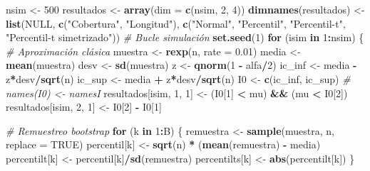 \documentclass[]{book}
\newenvironment{Shaded}{\begin{snugshade}}{\end{snugshade}}
\newcommand{\KeywordTok}[1]{\textcolor[rgb]{0.13,0.29,0.53}{\textbf{#1}}}
\newcommand{\DataTypeTok}[1]{\textcolor[rgb]{0.13,0.29,0.53}{#1}}
\newcommand{\DecValTok}[1]{\textcolor[rgb]{0.00,0.00,0.81}{#1}}
\newcommand{\FloatTok}[1]{\textcolor[rgb]{0.00,0.00,0.81}{#1}}
\newcommand{\StringTok}[1]{\textcolor[rgb]{0.31,0.60,0.02}{#1}}
\newcommand{\CommentTok}[1]{\textcolor[rgb]{0.56,0.35,0.01}{\textit{#1}}}
\newcommand{\OtherTok}[1]{\textcolor[rgb]{0.56,0.35,0.01}{#1}}
\newcommand{\ControlFlowTok}[1]{\textcolor[rgb]{0.13,0.29,0.53}{\textbf{#1}}}
\newcommand{\OperatorTok}[1]{\textcolor[rgb]{0.81,0.36,0.00}{\textbf{#1}}}
\newcommand{\NormalTok}[1]{#1}
\theoremstyle{definition}
\theoremstyle{definition}
\theoremstyle{definition}
\theoremstyle{remark}
\begin{document}
\begin{Shaded}
\begin{Highlighting}[]
{\NormalTok{nsim <-}\StringTok{ }\DecValTok{500}
\NormalTok{resultados <-}\StringTok{ }\KeywordTok{array}\NormalTok{(}\DataTypeTok{dim =} \KeywordTok{c}\NormalTok{(nsim, }\DecValTok{2}\NormalTok{, }\DecValTok{4}\NormalTok{))}
\KeywordTok{dimnames}\NormalTok{(resultados) <-}\StringTok{ }\KeywordTok{list}\NormalTok{(}\OtherTok{NULL}\NormalTok{, }\KeywordTok{c}\NormalTok{(}\StringTok{"Cobertura"}\NormalTok{, }\StringTok{"Longitud"}\NormalTok{),}
        \KeywordTok{c}\NormalTok{(}\StringTok{"Normal"}\NormalTok{, }\StringTok{"Percentil"}\NormalTok{, }\StringTok{"Percentil-t"}\NormalTok{, }\StringTok{"Percentil-t simetrizado"}\NormalTok{))}
\CommentTok{# Bucle simulación}
\KeywordTok{set.seed}\NormalTok{(}\DecValTok{1}\NormalTok{)}
\ControlFlowTok{for}\NormalTok{ (isim }\ControlFlowTok{in} \DecValTok{1}\OperatorTok{:}\NormalTok{nsim) \{}
    \CommentTok{# Aproximación clásica}
\NormalTok{    muestra <-}\StringTok{ }\KeywordTok{rexp}\NormalTok{(n, }\DataTypeTok{rate =} \FloatTok{0.01}\NormalTok{)}
\NormalTok{    media <-}\StringTok{ }\KeywordTok{mean}\NormalTok{(muestra)}
\NormalTok{    desv <-}\StringTok{ }\KeywordTok{sd}\NormalTok{(muestra)}
\NormalTok{    z <-}\StringTok{ }\KeywordTok{qnorm}\NormalTok{(}\DecValTok{1} \OperatorTok{-}\StringTok{ }\NormalTok{alfa}\OperatorTok{/}\DecValTok{2}\NormalTok{)}
\NormalTok{    ic_inf <-}\StringTok{ }\NormalTok{media }\OperatorTok{-}\StringTok{ }\NormalTok{z}\OperatorTok{*}\NormalTok{desv}\OperatorTok{/}\KeywordTok{sqrt}\NormalTok{(n)}
\NormalTok{    ic_sup <-}\StringTok{ }\NormalTok{media }\OperatorTok{+}\StringTok{ }\NormalTok{z}\OperatorTok{*}\NormalTok{desv}\OperatorTok{/}\KeywordTok{sqrt}\NormalTok{(n)}
\NormalTok{    I0 <-}\StringTok{ }\KeywordTok{c}\NormalTok{(ic_inf, ic_sup)}
    \CommentTok{# names(I0) <- namesI}
\NormalTok{    resultados[isim, }\DecValTok{1}\NormalTok{, }\DecValTok{1}\NormalTok{] <-}\StringTok{ }\NormalTok{(I0[}\DecValTok{1}\NormalTok{] }\OperatorTok{<}\StringTok{ }\NormalTok{mu) }\OperatorTok{&&}\StringTok{ }\NormalTok{(mu }\OperatorTok{<}\StringTok{ }\NormalTok{I0[}\DecValTok{2}\NormalTok{])}
\NormalTok{    resultados[isim, }\DecValTok{2}\NormalTok{, }\DecValTok{1}\NormalTok{] <-}\StringTok{ }\NormalTok{I0[}\DecValTok{2}\NormalTok{] }\OperatorTok{-}\StringTok{ }\NormalTok{I0[}\DecValTok{1}\NormalTok{]}
    
    \CommentTok{# Remuestreo bootstrap}
    \ControlFlowTok{for}\NormalTok{ (k }\ControlFlowTok{in} \DecValTok{1}\OperatorTok{:}\NormalTok{B) \{}
\NormalTok{        remuestra <-}\StringTok{ }\KeywordTok{sample}\NormalTok{(muestra, n, }\DataTypeTok{replace =} \OtherTok{TRUE}\NormalTok{)}
\NormalTok{        percentil[k] <-}\StringTok{ }\KeywordTok{sqrt}\NormalTok{(n) }\OperatorTok{*}\StringTok{ }\NormalTok{(}\KeywordTok{mean}\NormalTok{(remuestra) }\OperatorTok{-}\StringTok{ }\NormalTok{media)}
\NormalTok{        percentilt[k] <-}\StringTok{ }\NormalTok{percentil[k]}\OperatorTok{/}\KeywordTok{sd}\NormalTok{(remuestra)}
\NormalTok{        percentilts[k] <-}\StringTok{ }\KeywordTok{abs}\NormalTok{(percentilt[k])}
\NormalTok{    \}}
    
}
\end{Highlighting}
\end{Shaded}
\end{document}
